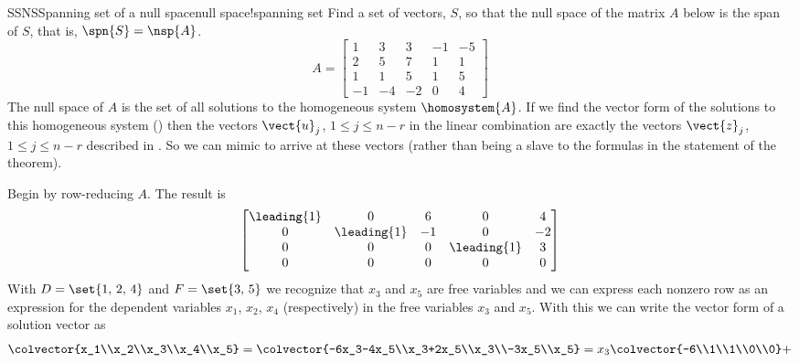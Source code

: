 \begin{example}{SSNS}{Spanning set of a null space}{null space!spanning set}
Find a set of vectors, $S$, so that the null space of the matrix $A$ below is the span of $S$, that is, $\spn{S}=\nsp{A}$.
%
\begin{equation*}
A=
\begin{bmatrix}
 1 & 3 & 3 & -1 & -5\\ 
 2 & 5 & 7 & 1 & 1\\ 
 1 & 1 & 5 & 1 & 5\\ 
 -1 & -4 & -2 & 0 & 4
\end{bmatrix}
\end{equation*}
%
The null space of $A$ is the set of all solutions to the homogeneous system $\homosystem{A}$.  If we find the vector form of the solutions to this homogeneous system () then the vectors $\vect{u}_j$, $1\leq j\leq n-r$ in the linear combination are exactly the vectors $\vect{z}_j$, $1\leq j\leq n-r$ described in .  So we can mimic  to arrive at these vectors (rather than being a slave to the formulas in the statement of the theorem).\par
%
Begin by row-reducing $A$.  The result is 
%
\begin{equation*}
\begin{bmatrix}
\leading{1} & 0 & 6 & 0 & 4\\ 
0 & \leading{1} & -1 & 0 & -2\\ 
0 & 0 & 0 & \leading{1} & 3\\ 
0 & 0 & 0 & 0 & 0
\end{bmatrix}
\end{equation*}
%
With $D=\set{1,\,2,\,4}$ and $F=\set{3,\,5}$ we recognize that $x_3$ and $x_5$ are free variables and we can express each nonzero row as an expression for the dependent variables $x_1$, $x_2$, $x_4$ (respectively) in the free variables $x_3$ and $x_5$.  With this we can write the vector form of a solution vector as
%
\begin{equation*}
\colvector{x_1\\x_2\\x_3\\x_4\\x_5}=
\colvector{-6x_3-4x_5\\x_3+2x_5\\x_3\\-3x_5\\x_5}=
x_3\colvector{-6\\1\\1\\0\\0}+

\end{equation*}
\end{example}

